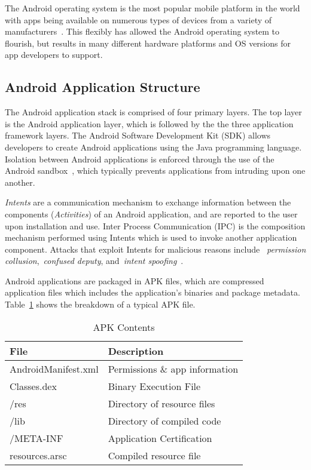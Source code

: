 

The Android operating system is the most popular mobile platform in the world with apps being available on numerous types of devices from a variety of manufacturers~\cite{androidpopularity_url}. This flexibly has allowed the Android operating system to flourish, but results in many different hardware platforms and OS versions for app developers to support.

\subsection{Android Application Structure}

The Android application stack is comprised of four primary layers. The top layer is the Android application layer, which is followed by the the three application framework layers. The Android Software Development Kit (SDK) allows developers to create Android applications using the Java programming language. Isolation between Android applications is enforced through the use of the Android sandbox~\cite{androidsecuritytips_url}, which typically prevents applications from intruding upon one another.

\emph{Intents} are a communication mechanism to exchange information between the components (\emph{Activities}) of an Android application, and are reported to the user upon installation and use. Inter Process Communication (IPC) is the composition mechanism performed using Intents which is used to invoke another application component. Attacks that exploit Intents for malicious reasons include ~\emph{permission collusion},~\emph{confused deputy}, and~\emph{intent spoofing}~\cite{Chin:2011:AIC:1999995.2000018,grace2012systematic, Marforio:2012:ACC:2420950.2420958, 6641043}.

Android applications are packaged in APK files, which are compressed application files which includes the application's binaries and package metadata. Table~\ref{Table:apkcontents} shows the breakdown of a typical APK file.



\begin{table}[ht]%
\begin{center}
\caption{APK Contents}
\label{Table:apkcontents}
  \begin{tabular}{| l | l | } \hline

    \bfseries File & \bfseries Description \\ \hline
    AndroidManifest.xml & Permissions \& app information \\ \hline
    Classes.dex & Binary Execution File \\ \hline
    /res & Directory of resource files \\ \hline
    /lib & Directory of compiled code \\ \hline
    /META-INF & Application Certification \\ \hline
    resources.arsc & Compiled resource file \\ \hline
  \end{tabular}
  \end{center}
\end{table}



